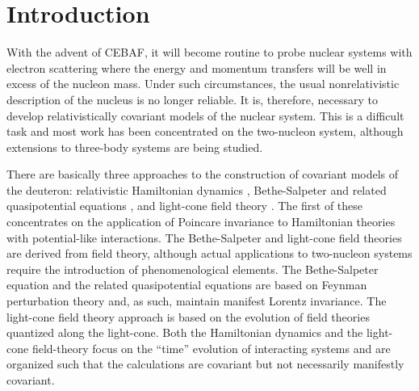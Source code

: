 \documentclass[mythesis.tex]{subfiles}
\begin{document}
\setcounter{chapter}{0}
\chapter{Introduction}

With the advent of CEBAF, it will become routine to probe nuclear
systems with electron scattering where the energy and momentum
transfers will be well in excess of the nucleon
mass. Under such circumstances, the usual
nonrelativistic description of the nucleus is no longer reliable. It is,
therefore, necessary to develop relativistically covariant models of the
nuclear system. This is a difficult task and most work has been concentrated
on the two-nucleon system, although extensions to three-body systems are
being studied.

There are basically three approaches to the construction of covariant models
of the deuteron: relativistic Hamiltonian dynamics
\cite{KeisterandPolyzou,Chung}, Bethe-Salpeter
\cite{BetheSalpeter,Tjon,Zuilhof,Umnikov} and related quasipotential equations
\cite{BSLT,Thompson,Todorov,Erkelenz,Kadychevsky,GrossA,GrossB,FVOHA,FVOHB,BuckandG,ACG,Hummel,WallaceandM,DevineandW,Zhu},
and light-cone field theory \cite{Fuda,Karmanov}. The first of these
concentrates on the application of Poincare invariance to Hamiltonian
theories with potential-like interactions. The Bethe-Salpeter and light-cone
field theories are derived from field theory, although actual applications
to two-nucleon systems require the introduction of phenomenological
elements. The Bethe-Salpeter equation and the related quasipotential
equations are based on Feynman perturbation theory and, as such, maintain
manifest Lorentz invariance. The light-cone field theory approach is based
on the evolution of field theories quantized along the light-cone. Both the
Hamiltonian dynamics and the light-cone field-theory focus on the ``time''
evolution of interacting systems and are organized such that the
calculations are covariant but not necessarily manifestly covariant.
\end{document}
